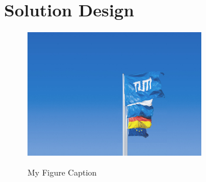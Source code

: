 \chapter{Solution Design}
\label{sec:solution}

\begin{figure}[h]
    \centering
    \caption{My Figure Caption}
    \includegraphics[width=0.7\textwidth]{tum-resources/images/Universitaet_Flaggen.jpg}
    \label{fig:firstFigure}
\end{figure}
